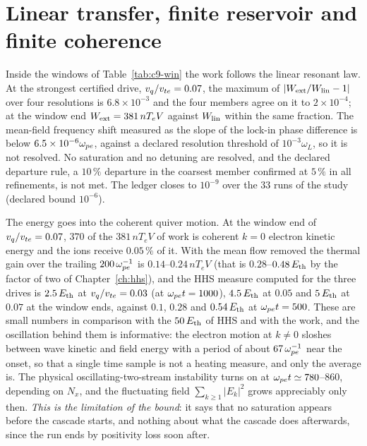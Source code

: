 \section{Linear transfer, finite reservoir and finite coherence}\label{sec:c9-r1}


Inside the windows of Table~\ref{tab:c9-win} the work follows the linear resonant law. At the strongest certified drive, $v_q/v_{te}=0.07$, the maximum of $|W_{\rm ext}/W_{\rm lin}-1|$ over four resolutions is $6.8\times10^{-3}$ and the four members agree on it to $2\times10^{-4}$; at the window end $W_{\rm ext}=381\,nT_eV$ against $W_{\rm lin}$ within the same fraction. The mean-field frequency shift measured as the slope of the lock-in phase difference is below $6.5\times10^{-6}\omega_{pe}$, against a declared resolution threshold of $10^{-3}\omega_L$, so it is not resolved. No saturation and no detuning are resolved, and the declared departure rule, a $10\,\%$ departure in the coarsest member confirmed at $5\,\%$ in all refinements, is not met. The ledger closes to $10^{-9}$ over the 33 runs of the study (declared bound $10^{-6}$).

The energy goes into the coherent quiver motion. At the window end of $v_q/v_{te}=0.07$, $370$ of the $381\,nT_eV$ of work is coherent $k=0$ electron kinetic energy and the ions receive $0.05\,\%$ of it. With the mean flow removed the thermal gain over the trailing $200\,\omega_{pe}^{-1}$ is $0.14$--$0.24\,nT_eV$ (that is $0.28$--$0.48\,E_{\rm th}$ by the factor of two of Chapter~\ref{ch:hhs}), and the HHS measure computed for the three drives is $2.5\,E_{\rm th}$ at $v_q/v_{te}=0.03$ (at $\omega_{pe} t=1000$), $4.5\,E_{\rm th}$ at $0.05$ and $5\,E_{\rm th}$ at $0.07$ at the window ends, against $0.1$, $0.28$ and $0.54\,E_{\rm th}$ at $\omega_{pe} t=500$. These are small numbers in comparison with the $50\,E_{\rm th}$ of HHS and with the work, and the oscillation behind them is informative: the electron motion at $k\ne0$ sloshes between wave kinetic and field energy with a period of about $67\,\omega_{pe}^{-1}$ near the onset, so that a single time sample is not a heating measure, and only the average is. The physical oscillating-two-stream instability turns on at $\omega_{pe} t\simeq780$--$860$, depending on $N_x$, and the fluctuating field $\sum_{k\ge1}|E_k|^2$ grows appreciably only then. \emph{This is the limitation of the bound}: it says that no saturation appears before the cascade starts, and nothing about what the cascade does afterwards, since the run ends by positivity loss soon after.


